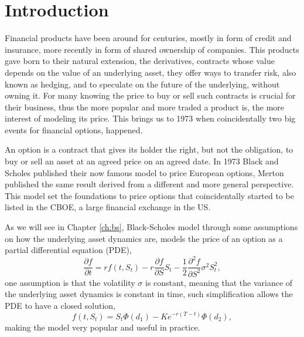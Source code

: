 \chapter{Introduction}

Financial products have been around for centuries,
mostly in form of credit and insurance,
more recently in form of shared ownership of companies.
This products gave born to their natural extension, the derivatives,
contracts whose value depends on the value of an underlying asset,
they offer ways to transfer risk, also known as hedging,
and to speculate on the future of the underlying,
without owning it.
For many knowing the price to buy or sell such contracts is crucial for their business,
thus the more popular and more traded a product is,
the more interest of modeling its price.
This brings us to 1973 when coincidentally two big events for financial options,
happened.

An option is a contract that gives its holder the right,
but not the obligation,
to buy or sell an asset at an agreed price on an agreed date.
In 1973 Black and Scholes \cite{Black1973} published their now famous model to price European options,
Merton \cite{Merton1973} published the same result derived from a different and more general perspective.
This model set the foundations to price options that coincidentally started to be listed in the CBOE,
a large financial exchange in the US.

As we will see in Chapter \ref{ch:bs},
Black-Scholes model through some assumptions on how the underlying asset dynamics are,
models the price of an option as a partial differential equation (PDE),
\begin{equation*}
    \frac{\partial f}{\partial t} =
        r f(t, S_t)
        - r \frac{\partial f}{\partial S} S_t 
        - \frac{1}{2} \frac{\partial^2 f}{\partial S^2} \sigma^2 S_t^2,
\end{equation*}
one assumption is that the volatility $\sigma$ is constant,
meaning that the variance of the underlying asset dynamics is constant in time,
such simplification allows the PDE to have a closed solution,
\begin{equation*}
    f(t, S_t) = S_t \Phi(d_1) - K e^{-r(T-t)} \Phi(d_2),
\end{equation*}
making the model very popular and useful in practice.

